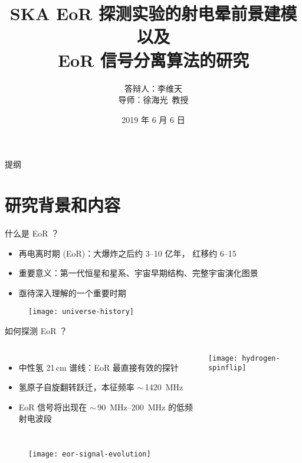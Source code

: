 \documentclass{beamer}
\title{%
  SKA EoR 探测实验的射电晕前景建模以及\texorpdfstring{\\}{ }%
  EoR 信号分离算法的研究%
}
\author{%
  答辩人：李维天\texorpdfstring{\\}{ / }
  导师：徐海光~教授
}
\institute{%
  物理与天文学院\\%
  上海交通大学%
}
\date{\small 2019 年 6 月 6 日}
\begin{document}
\maketitle

\begin{frame}{提\cspace{}纲}
  \tableofcontents[hideallsubsections]
\end{frame}


\section{研究背景和内容}

\begin{frame}{什么是 EoR ？}
  \begin{itemize}
    \item \alert{再电离时期 (EoR)}：大爆炸之后约 \numrange{3}{10} 亿年，
      红移约 \numrange{6}{15}
    \item \alert{重要意义}：第一代恒星和星系、宇宙早期结构、完整宇宙演化图景
    \item 亟待深入理解的一个重要时期
  \end{itemize}

  \vspace{-1ex}
  \begin{figure}
    \centering
    \texttt{[image: universe-history]}
  \end{figure}
\end{frame}

\begin{frame}{如何探测 EoR ？}
  \begin{columns}
  \begin{itemize}
    \item \alert{中性氢 21\,cm 谱线}：EoR 最直接有效的探针
    \item 氢原子自旋翻转跃迁，本征频率 $\sim$\,\SI{1420}{\MHz}
    \item EoR 信号将出现在 $\sim$\,\SIrange{90}{200}{\MHz}
      的\alert{低频射电波段}
  \end{itemize}

    \texttt{[image: hydrogen-spinflip]}
  \end{columns}

  \vspace{-1ex}
  \begin{figure}
    \centering
    \texttt{[image: eor-signal-evolution]}
  \end{figure}
\end{frame}
\end{document}
